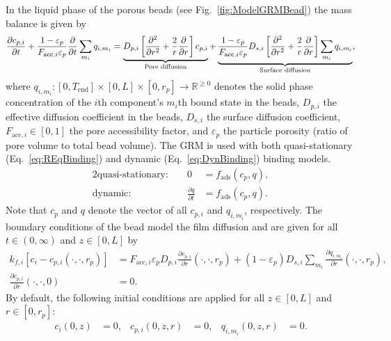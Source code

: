 In the liquid phase of the porous beads (see Fig.~\ref{fig:ModelGRMBead}) the mass balance is given by
\begin{align}
	\frac{\pdiff c_{p,i}}{\pdiff t} + \frac{1 - \varepsilon_p}{F_{\text{acc},i} \varepsilon_p} \frac{\pdiff}{\pdiff t} \sum_{m_i} q_{i,m_i} = \underbrace{D_{p,i} \left[\frac{\pdiff^2}{\pdiff r^2} + \frac{2}{r} \frac{\pdiff}{\pdiff r} \right]c_{p,i}}_{\text{Pore diffusion}} + \underbrace{\frac{1 - \varepsilon_p}{F_{\text{acc},i} \varepsilon_p} D_{s,i} \left[\frac{\pdiff^2}{\pdiff r^2} + \frac{2}{r} \frac{\pdiff }{\pdiff r} \right] \sum_{m_i} q_{i,m_i} }_{\text{Surface diffusion}}, \label{eq:ModelBead}
\end{align}
where $q_{i,m_i}\colon \left[0, T_{\text{end}}\right] \times [0,L] \times [0, r_p] \rightarrow \mathds{R}^{\geq 0}$ denotes the solid phase concentration of the $i$th component's $m_i$th bound state in the beads, $D_{p,i}$ the effective diffusion coefficient in the beads, $D_{s,i}$ the surface diffusion coefficient, $F_{\text{acc},i} \in [0,1]$ the pore accessibility factor, and $\varepsilon_p$ the particle porosity (ratio of pore volume to total bead volume).
The GRM is used with both quasi-stationary (Eq.~\eqref{eq:REqBinding}) and dynamic (Eq.~\eqref{eq:DynBinding}) binding models. 
\begin{alignat}{2}
	\text{quasi-stationary: }& & 0 &= f_{\text{ads}}( c_p, q), \label{eq:REqBinding} \\
	\text{dynamic: }& & \frac{\partial q}{\partial t} &= f_{\text{ads}}( c_p, q). \label{eq:DynBinding}
\end{alignat}
Note that $c_p$ and $q$ denote the vector of all $c_{p,i}$ and $q_{i,m_i}$, respectively.
The boundary conditions of the bead model the film diffusion and are given for all ${t \in (0,\infty)}$ and $z \in [0,L]$ by
\begin{align}
	k_{f,i}\left[ c_i - c_{p,i}(\cdot, \cdot, r_p) \right] &= F_{\text{acc},i} \varepsilon_p D_{p,i} \frac{\partial c_{p,i}}{\partial r}(\cdot, \cdot, r_p) + \left( 1 - \varepsilon_p\right) D_{s,i} \sum_{m_i} \frac{\partial q_{i,m_i}}{\partial r}(\cdot, \cdot, r_p), \label{eq:BCBeadIn} \\
	\frac{\partial c_{p,i}}{\partial r}(\cdot, \cdot, 0) &= 0. \label{eq:BCBeadCenter}
\end{align}
By default, the following initial conditions are applied for all $z \in [0,L]$ and $r \in \left[0, r_p\right]$:
\begin{align}
	c_i(0, z) &= 0, & c_{p,i}(0, z, r) &= 0, & q_{i,m_i}(0,z,r) &= 0. \label{eq:InitialConditions}
\end{align}

